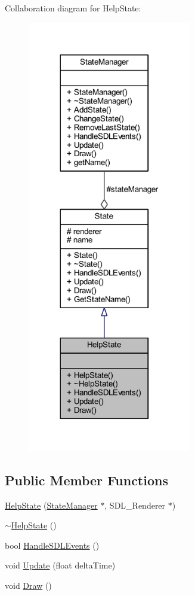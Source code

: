 Collaboration diagram for Help\+State\+:
\nopagebreak
\begin{figure}[H]
\begin{center}
\leavevmode
\includegraphics[width=203pt]{class_help_state__coll__graph}
\end{center}
\end{figure}
\subsection*{Public Member Functions}
\begin{DoxyCompactItemize}
\item 
\hyperlink{class_help_state_a2c988d45d9f13b048fa8e44ad4c49571}{Help\+State} (\hyperlink{class_state_manager}{State\+Manager} $\ast$, S\+D\+L\+\_\+\+Renderer $\ast$)
\item 
\hyperlink{class_help_state_a9698cf3f338866bcbd05ec25fa20700c}{$\sim$\+Help\+State} ()
\item 
bool \hyperlink{class_help_state_a7149e10e0129b66a68290d259bce3015}{Handle\+S\+D\+L\+Events} ()
\item 
void \hyperlink{class_help_state_ac9a45859141cae970629aac1e7a69184}{Update} (float delta\+Time)
\item 
void \hyperlink{class_help_state_a281d12605303cc444e600b214a8d2161}{Draw} ()
\end{DoxyCompactItemize}

